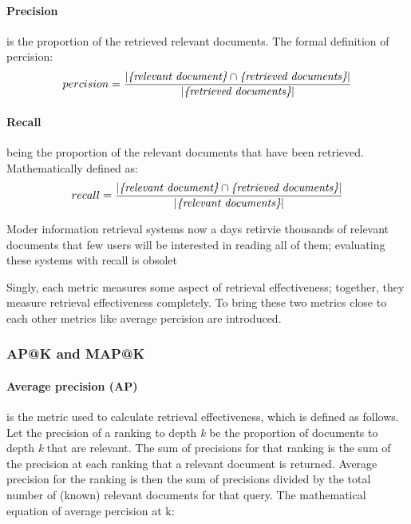 \paragraph*{Precision} is the proportion of the retrieved relevant documents. The formal definition of percision:
\begin{equation}
	percision = \frac{|\emph{\{relevant document\}} \cap \emph{\{retrieved documents\}}|}{|\emph{\{retrieved documents\}}|}
	\label{eq:percision}
\end{equation}

\paragraph*{Recall} being the proportion of the relevant documents that have been retrieved. Mathematically defined as:
\begin{equation}
	recall = \frac{|\emph{\{relevant document\}} \cap \emph{\{retrieved documents\}}|}{|\emph{\{relevant documents\}}|}
	\label{eq:recall}
\end{equation}

Moder information retrieval systems now a days retirvie thousands of relevant documents that few users will be interested in reading all of them; evaluating these systems with recall is obsolet 

Singly, each metric measures some aspect of retrieval effectiveness; together, they measure retrieval effectiveness completely. To bring these two metrics close to each other metrics like average percision are introduced.

\subsubsection{AP@K and MAP@K}
\label{AP@K and MAP@K}
\paragraph*{Average precision (AP)} is the metric used to calculate retrieval effectiveness, which is defined as follows. 
Let the precision of a ranking to depth \emph{k} be
the proportion of documents to depth \emph{k} that are relevant. The sum of precisions for that ranking is the sum of the precision at each ranking that a relevant document is returned.
Average precision for the ranking is then the sum of precisions divided by the total number of (known) relevant documents for that query.
The mathematical equation of average percision at k:


